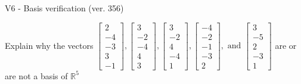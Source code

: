 \begin{exercise}
  \begin{exerciseTitle}V6 - Basis verification (ver. 356)\end{exerciseTitle}
  \begin{exerciseStatement}
    Explain why the vectors \(\left[\begin{array}{r}
2 \\
-4 \\
-3 \\
3 \\
-1
\end{array}\right] , \left[\begin{array}{r}
3 \\
-2 \\
-4 \\
4 \\
3
\end{array}\right] , \left[\begin{array}{r}
3 \\
-2 \\
4 \\
-4 \\
1
\end{array}\right] , \left[\begin{array}{r}
-4 \\
-2 \\
-1 \\
-3 \\
2
\end{array}\right] , \text{ and } \left[\begin{array}{r}
3 \\
-5 \\
2 \\
-3 \\
1
\end{array}\right]\) are or are not a basis of \(\mathbb{R}^5\)	



\end{exerciseStatement}
\end{exercise}
